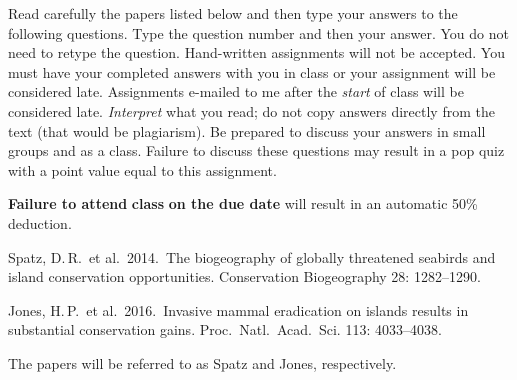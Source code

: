 \documentclass[11pt, addpoints]{exam}
\begin{document}
Read carefully the papers listed below and then type your answers to the following questions.
Type the question number and then your answer. You do not need to retype the question. Hand-written
assignments will not be accepted. You must have your completed answers
with you in class or your assignment will be considered late. Assignments e-mailed to me after the \emph{start} of class will be
considered late. \emph{Interpret} what you read; do not copy answers directly from the text (that would
be plagiarism). Be prepared to discuss your answers in small groups and as a class. Failure
to discuss these questions may result in a pop quiz with a point value
equal to this assignment.

\textbf{Failure to attend} \textbf{class} \textbf{on the due date} will
result in an automatic 50\% deduction.

\begin{hangparas}{1.5em}{1}
Spatz, D.\,R.~et al.~2014.~The biogeography of globally threatened seabirds and 
island conservation opportunities. Conservation Biogeography 28: 1282–1290.

Jones, H.\,P.~et al.~2016.~Invasive mammal eradication on islands results in 
substantial conservation gains. Proc.~Natl.~Acad.~Sci. 113: 4033–4038. 
\end{hangparas}

The papers will be referred to as Spatz and Jones, respectively.
\end{document}
